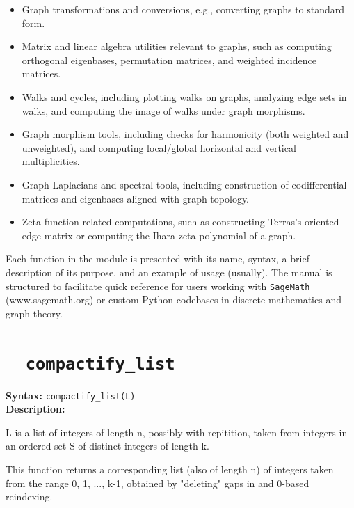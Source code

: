 \documentclass{article}
\begin{document}
\begin{itemize}
\item
Graph transformations and conversions, e.g., converting graphs to
standard form.

\item
Matrix and linear algebra utilities relevant to graphs, such
as computing orthogonal eigenbases, permutation matrices,
and weighted incidence matrices.

\item
Walks and cycles, including plotting walks on graphs,
analyzing edge sets in walks, and computing the image of walks
under graph morphisms.

\item
Graph morphism tools, including checks for harmonicity
(both weighted and unweighted), and computing local/global
horizontal and vertical multiplicities.

\item
Graph Laplacians and spectral tools, including construction
of codifferential matrices and eigenbases aligned with graph topology.

\item
Zeta function-related computations, such as constructing
Terras's oriented edge matrix or computing the Ihara zeta polynomial
of a graph.

\end{itemize}

Each function in the module is presented with its name, syntax,
a brief description of its purpose, and an example of usage
(usually). The manual is structured to facilitate quick
reference for users working with {\tt SageMath}
(www.sagemath.org) or custom
Python codebases in discrete mathematics and graph theory.

\section{\tt \ \ compactify\_list}

\textbf{Syntax:} \verb}compactify_list(L)}\\

\textbf{Description:}

L is a list of integers of length n, possibly with repitition,
    taken from integers in an ordered set 
    S of distinct integers of length k.
    
    This function returns a corresponding list (also of length n)
    of integers taken from the range {0, 1, ..., k-1}, obtained by
    "deleting" gaps in and 0-based reindexing.
\end{document}
